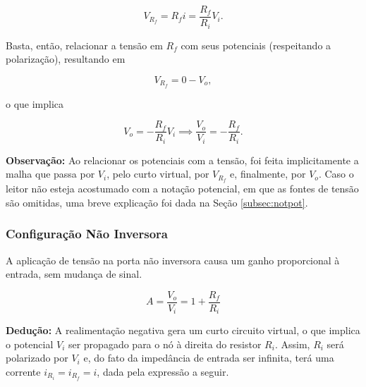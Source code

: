 \documentclass{article}
\numberwithin{equation}{section}
\begin{document}
\begin{equation*}
    V_{R_f} = R_f i = \dfrac{R_f}{R_i} V_i.
\end{equation*}

\noindent Basta, então, relacionar a tensão em $R_f$ com seus potenciais (respeitando a polarização), resultando em

\begin{equation*}
    V_{R_f} = 0 - V_o,
\end{equation*}

\noindent o que implica

\begin{equation*}
    V_o = -\dfrac{R_f}{R_i} V_i \implies \dfrac{V_o}{V_i} = -\dfrac{R_f}{R_i}.
\end{equation*}

\textbf{Observação:} Ao relacionar os potenciais com a tensão, foi feita implicitamente a malha que passa por $V_i$, pelo curto virtual, por $V_{R_f}$ e, finalmente, por $V_o$. Caso o leitor não esteja acostumado com a notação potencial, em que as fontes de tensão são omitidas, uma breve explicação foi dada na Seção \ref{subsec:notpot}.

\subsubsection{Configuração Não Inversora}
A aplicação de tensão na porta não inversora causa um ganho proporcional à entrada, sem mudança de sinal.

\begin{center}
\end{center}

\begin{equation}
    A=\frac{V_{o}}{V_{i}}=1+\frac{R_{f}}{R_{i}}
\end{equation}

\textbf{Dedução:} A realimentação negativa gera um curto circuito virtual, o que implica o potencial $V_i$ ser propagado para o nó à direita do resistor $R_i$. Assim, $R_i$ será polarizado por $V_i$ e, do fato da impedância de entrada ser infinita, terá uma corrente $i_{R_i} = i_{R_f} = i$, dada pela expressão a seguir.
\end{document}
